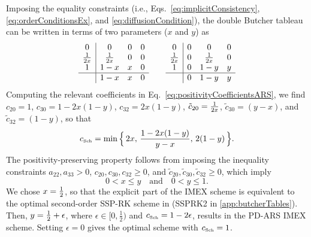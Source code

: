 Imposing the equality constraints (i.e., Eqs.~\eqref{eq:implicitConsistency}, \eqref{eq:orderConditionsEx}, and \eqref{eq:diffusionCondition}), the double Butcher tableau can be written in terms of two parameters ($x$ and $y$) as
\begin{equation}
  \begin{array}{c | c c c}
  	     0       & 0            & 0 & 0 \\
  	\frac{1}{2x} & \frac{1}{2x} & 0 & 0 \\
  	     1       & 1-x          & x & 0 \\ \hline
  	             & 1-x          & x & 0
  \end{array}
  \qquad
  \begin{array}{c | c c c}
  	     0       & 0 & 0            & 0 \\
  	\frac{1}{2x} & 0 & \frac{1}{2x} & 0 \\
  	     1       & 0 & 1-y          & y \\ \hline
  	             & 0 & 1-y          & y
  \end{array}
\end{equation}
Computing the relevant coefficients in Eq.~\eqref{eq:positivityCoefficientsARS}, we find $c_{20}=1$, $c_{30}=1-2x(1-y)$, $c_{32}=2x(1-y)$, $\tilde{c}_{20}=\frac{1}{2x}$, $\tilde{c}_{30}=(y-x)$, and $\tilde{c}_{32}=(1-y)$, so that
\begin{equation}
  c_{\mbox{\tiny Sch}} = \min \Big\{\, 2x,\, \frac{1-2x(1-y)}{y-x},\, 2(1-y) \,\Big\}.  
\end{equation}
The positivity-preserving property follows from imposing the inequality constraints $a_{22},a_{33}>0$, $c_{20},c_{30},c_{32}\ge0$, and $\tilde{c}_{20},\tilde{c}_{30},\tilde{c}_{32}\ge0$, which imply
\begin{equation}
  0 < x \le y
  \quad\text{and}\quad
  0 < y \le 1.
\end{equation}
We chose $x=\frac{1}{2}$, so that the explicit part of the IMEX scheme is equivalent to the optimal second-order SSP-RK scheme in \cite{gottlieb_etal_2001} (SSPRK2 in \ref{app:butcherTables}).  
Then, $y=\frac{1}{2} + \epsilon$, where $\epsilon \in [0, \frac{1}{2})$ and $c_{\mbox{\tiny Sch}} = 1 - 2\epsilon$, results in the PD-ARS IMEX scheme.  
Setting $\epsilon = 0$ gives the optimal scheme with $c_{\mbox{\tiny Sch}} = 1$.  

